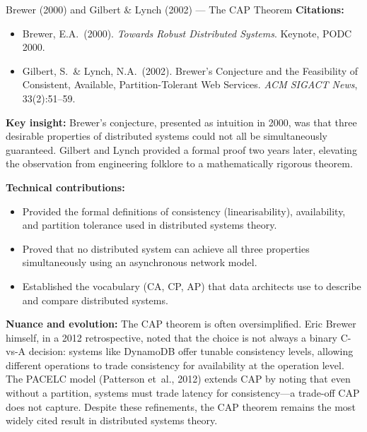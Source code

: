 \begin{researchspotlight}{Brewer (2000) and Gilbert \& Lynch (2002) --- The CAP Theorem}
\textbf{Citations:}
\begin{itemize}
  \item Brewer, E.A.\ (2000). \textit{Towards Robust Distributed Systems}.
        Keynote, PODC 2000. \parencite{Brewer2000}
  \item Gilbert, S.\ \& Lynch, N.A.\ (2002). Brewer's Conjecture and the
        Feasibility of Consistent, Available, Partition-Tolerant Web
        Services. \textit{ACM SIGACT News}, 33(2):51--59.
        \parencite{GilbertLynch2002}
\end{itemize}

\smallskip\noindent
\textbf{Key insight:} Brewer's conjecture, presented as intuition in
2000, was that three desirable properties of distributed systems could
not all be simultaneously guaranteed. Gilbert and Lynch provided a
formal proof two years later, elevating the observation from engineering
folklore to a mathematically rigorous theorem.

\smallskip\noindent
\textbf{Technical contributions:}
\begin{itemize}
  \item Provided the formal definitions of consistency (linearisability),
        availability, and partition tolerance used in distributed systems
        theory.
  \item Proved that no distributed system can achieve all three
        properties simultaneously using an asynchronous network model.
  \item Established the vocabulary (CA, CP, AP) that data architects use
        to describe and compare distributed systems.
\end{itemize}

\smallskip\noindent
\textbf{Nuance and evolution:} The CAP theorem is often oversimplified.
Eric Brewer himself, in a 2012 retrospective, noted that the choice is
not always a binary C-vs-A decision: systems like DynamoDB offer tunable
consistency levels, allowing different operations to trade consistency
for availability at the operation level. The PACELC model (Patterson
et~al., 2012) extends CAP by noting that even without a partition,
systems must trade latency for consistency---a trade-off CAP does not
capture. Despite these refinements, the CAP theorem remains the most
widely cited result in distributed systems theory.
\end{researchspotlight}


